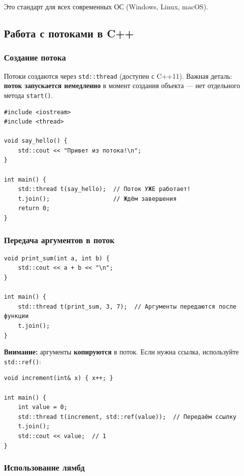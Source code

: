 \documentclass[a4paper,12pt]{article}
\begin{document}
Это стандарт для всех современных ОС (Windows, Linux, macOS).

\subsection{Работа с потоками в C++}

\subsubsection{Создание потока}

Потоки создаются через \texttt{std::thread} (доступен с C++11). Важная деталь:
\textbf{поток запускается немедленно} в момент создания объекта --- нет отдельного
метода \texttt{start()}.

\begin{lstlisting}
#include <iostream>
#include <thread>

void say_hello() {
    std::cout << "Привет из потока!\n";
}

int main() {
    std::thread t(say_hello);  // Поток УЖЕ работает!
    t.join();                  // Ждём завершения
    return 0;
}
\end{lstlisting}

\subsubsection{Передача аргументов в поток}

\begin{lstlisting}
void print_sum(int a, int b) {
    std::cout << a + b << "\n";
}

int main() {
    std::thread t(print_sum, 3, 7);  // Аргументы передаются после функции
    t.join();
}
\end{lstlisting}

\textbf{Внимание:} аргументы \textbf{копируются} в поток.
Если нужна ссылка, используйте \texttt{std::ref()}:

\begin{lstlisting}
void increment(int& x) { x++; }

int main() {
    int value = 0;
    std::thread t(increment, std::ref(value));  // Передаём ссылку
    t.join();
    std::cout << value;  // 1
}
\end{lstlisting}

\subsubsection{Использование лямбд}
\end{document}
